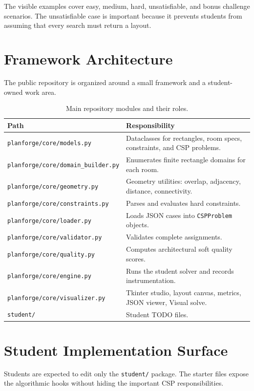 \documentclass[11pt]{article}
\begin{document}
The visible examples cover easy, medium, hard, unsatisfiable, and bonus challenge scenarios.
The unsatisfiable case is important because it prevents students from assuming that every search
must return a layout.

\section{Framework Architecture}

The public repository is organized around a small framework and a student-owned work area.

\begin{table}[H]
\centering
\begin{tabular}{ll}
\toprule
Path & Responsibility \\
\midrule
\texttt{planforge/core/models.py} & Dataclasses for rectangles, room specs, constraints, and CSP problems. \\
\texttt{planforge/core/domain\_builder.py} & Enumerates finite rectangle domains for each room. \\
\texttt{planforge/core/geometry.py} & Geometry utilities: overlap, adjacency, distance, connectivity. \\
\texttt{planforge/core/constraints.py} & Parses and evaluates hard constraints. \\
\texttt{planforge/core/loader.py} & Loads JSON cases into \texttt{CSPProblem} objects. \\
\texttt{planforge/core/validator.py} & Validates complete assignments. \\
\texttt{planforge/core/quality.py} & Computes architectural soft quality scores. \\
\texttt{planforge/core/engine.py} & Runs the student solver and records instrumentation. \\
\texttt{planforge/core/visualizer.py} & Tkinter studio, layout canvas, metrics, JSON viewer, Visual solve. \\
\texttt{student/} & Student TODO files. \\
\bottomrule
\end{tabular}
\caption{Main repository modules and their roles.}
\end{table}

\section{Student Implementation Surface}

Students are expected to edit only the \texttt{student/} package. The starter files expose the
algorithmic hooks without hiding the important CSP responsibilities.
\end{document}
